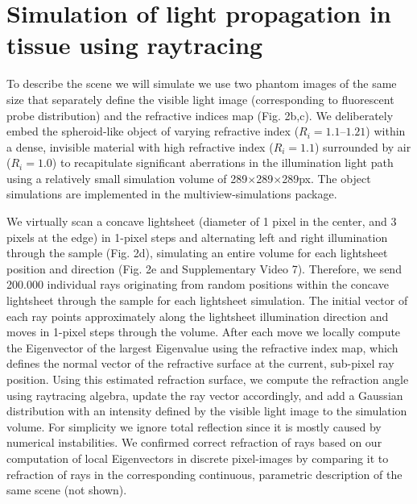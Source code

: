\section{Simulation of light propagation in tissue using raytracing}
\label{sec:raytracing}

To describe the scene we will simulate we use two phantom images of the same size that separately define the visible light image (corresponding to fluorescent probe distribution) and the refractive indices map (Fig. 2b,c). We deliberately embed the spheroid-like object of varying refractive index ($R_i=1.1 – 1.21$) within a dense, invisible material with high refractive index ($R_i=1.1$) surrounded by air ($R_i=1.0$) to recapitulate significant aberrations in the illumination light path using a relatively small simulation volume of 289$\times$289$\times$289px. The object simulations are implemented in the multiview-simulations package\cite{mvdecon}.

We virtually scan a concave lightsheet (diameter of 1 pixel in the center, and 3 pixels at the edge) in 1-pixel steps and alternating left and right illumination through the sample (Fig. 2d), simulating an entire volume for each lightsheet position and direction (Fig. 2e and Supplementary Video 7). Therefore, we send 200.000 individual rays originating from random positions within the concave lightsheet through the sample for each lightsheet simulation. The initial vector of each ray points approximately along the lightsheet illumination direction and moves in 1-pixel steps through the volume. After each move we locally compute the Eigenvector of the largest Eigenvalue using the refractive index map, which defines the normal vector of the refractive surface at the current, sub-pixel ray position. Using this estimated refraction surface, we compute the refraction angle using raytracing algebra\cite{raytracing}, update the ray vector accordingly, and add a Gaussian distribution with an intensity defined by the visible light image to the simulation volume. For simplicity we ignore total reflection since it is mostly caused by numerical instabilities. We confirmed correct refraction of rays based on our computation of local Eigenvectors in discrete pixel-images by comparing it to refraction of rays in the corresponding continuous, parametric description of the same scene (not shown). 


